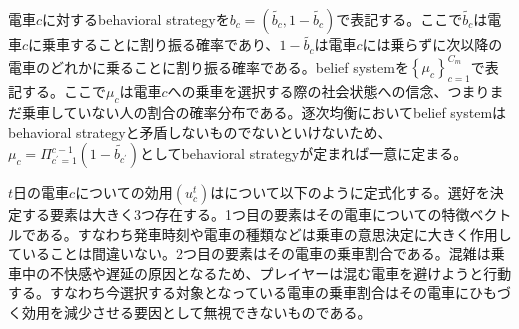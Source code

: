 \documentclass{jsarticle}
\begin{document}
電車$c$に対するbehavioral strategyを$b_c = (\tilde{b_c}, 1 - \tilde{b_c})$で表記する。ここで$\tilde{b_c}$は電車$c$に乗車することに割り振る確率であり、$1 - \tilde{b_c}$は電車$c$には乗らずに次以降の電車のどれかに乗ることに割り振る確率である。belief systemを$\left\{ \mu_c \right\}_{c = 1}^{C_m}$で表記する。ここで$\mu_c$は電車$c$への乗車を選択する際の社会状態への信念、つまりまだ乗車していない人の割合の確率分布である。逐次均衡においてbelief systemはbehavioral strategyと矛盾しないものでないといけないため、$\mu_c = \Pi_{c^{'} = 1}^{c-1} (1 - \tilde{b_{c^{'}}})$としてbehavioral strategyが定まれば一意に定まる。

$t$日の電車$c$についての効用$(u_c^t)$はについて以下のように定式化する。選好を決定する要素は大きく3つ存在する。1つ目の要素はその電車についての特徴ベクトルである。すなわち発車時刻や電車の種類などは乗車の意思決定に大きく作用していることは間違いない。2つ目の要素はその電車の乗車割合である。混雑は乗車中の不快感や遅延の原因となるため、プレイヤーは混む電車を避けようと行動する。すなわち今選択する対象となっている電車の乗車割合はその電車にひもづく効用を減少させる要因として無視できないものである。
\end{document}
